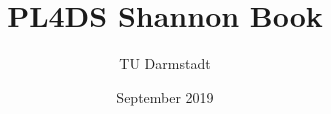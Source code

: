 \begin{titlepage}
	\author{TU Darmstadt}
	\title{PL4DS Shannon Book}
	\date{September 2019}
\end{titlepage}
